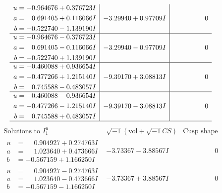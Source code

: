 \documentclass[1p]{elsarticle_modified}
\theoremstyle{definition}
\newcommand{\I}{\sqrt{-1}}
\begin{document}
$$\begin{array}{c|c|c}
\begin{aligned}
u &= -0.964676 + 0.376723 I \\
a &= \phantom{-}0.691405 + 0.116066 I \\
b &= -0.522740 - 1.139190 I\end{aligned}
 & -3.29940 + 0.97709 I & \phantom{-0.000000 } 0 \\ \hline\begin{aligned}
u &= -0.964676 - 0.376723 I \\
a &= \phantom{-}0.691405 - 0.116066 I \\
b &= -0.522740 + 1.139190 I\end{aligned}
 & -3.29940 - 0.97709 I & \phantom{-0.000000 } 0 \\ \hline\begin{aligned}
u &= -0.460088 + 0.936654 I \\
a &= -0.477266 + 1.215140 I \\
b &= \phantom{-}0.745588 - 0.483057 I\end{aligned}
 & -9.39170 + 3.08813 I & \phantom{-0.000000 } 0 \\ \hline\begin{aligned}
u &= -0.460088 - 0.936654 I \\
a &= -0.477266 - 1.215140 I \\
b &= \phantom{-}0.745588 + 0.483057 I\end{aligned}
 & -9.39170 - 3.08813 I & \phantom{-0.000000 } 0\\
 \hline 
 \end{array}$$\newpage$$\begin{array}{c|c|c}  
\text{Solutions to }I^u_{1}& \I (\text{vol} + \sqrt{-1}CS) & \text{Cusp shape}\\
 \hline 
\begin{aligned}
u &= \phantom{-}0.904927 + 0.274763 I \\
a &= \phantom{-}1.023640 + 0.473666 I \\
b &= -0.567159 + 1.166250 I\end{aligned}
 & -3.73367 - 3.88567 I & \phantom{-0.000000 } 0 \\ \hline\begin{aligned}
u &= \phantom{-}0.904927 - 0.274763 I \\
a &= \phantom{-}1.023640 - 0.473666 I \\
b &= -0.567159 - 1.166250 I\end{aligned}
 & -3.73367 + 3.88567 I & \phantom{-0.000000 } 0 \\ \hline\begin{aligned}

\end{aligned}
\end{array}$$
\end{document}
